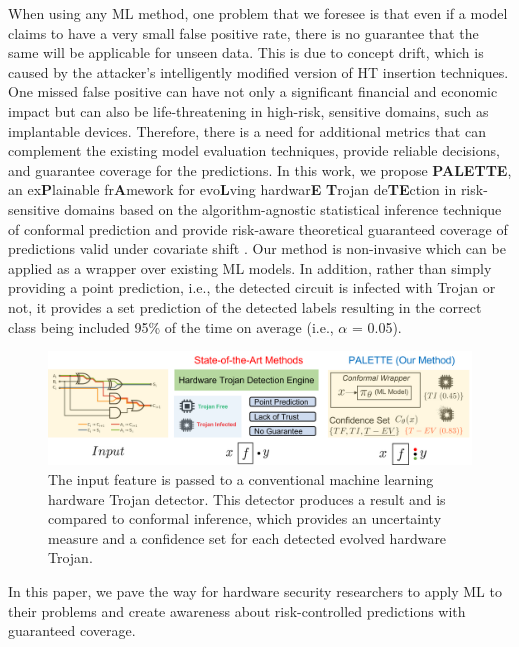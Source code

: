 When using any ML method, one problem that we foresee is that even if a model claims to have a very small false positive rate, there is no guarantee that the same will be applicable for unseen data. This is due to concept drift, which is caused by the attacker's intelligently modified version of HT insertion techniques. One missed false positive can have not only a significant financial and economic impact but can also be life-threatening in high-risk, sensitive domains, such as implantable devices. Therefore, there is a need for additional metrics that can complement the existing model evaluation techniques, provide reliable decisions, and guarantee coverage for the predictions. In this work, we propose \textbf{PALETTE}, an ex\textbf{P}lainable fr\textbf{A}mework for evo\textbf{L}ving hardwar\textbf{E} \textbf{T}rojan de\textbf{TE}ction in risk-sensitive domains based on the algorithm-agnostic statistical inference technique of conformal prediction \cite{shafer2008tutorial} and provide risk-aware theoretical guaranteed coverage of predictions valid under covariate shift \cite{tibshirani2019conformal}. Our method is non-invasive which can be applied as a wrapper over existing ML models. In addition, rather than simply providing a point prediction, i.e., the detected circuit is infected with Trojan or not, it provides a set prediction of the detected labels resulting in the correct class being included 95\% of the time on average (i.e., $\alpha$ = 0.05).

\begin{figure}[ht]
  \centering
   \includegraphics[width=0.95\linewidth]{figs/Intro3.png}
   \caption{The input feature is passed to a conventional machine learning hardware Trojan detector. This detector produces a result and is compared to conformal inference, which provides an uncertainty measure and a confidence set for each detected evolved hardware Trojan.}
  \label{fig:intro}
\end{figure}


In this paper, we pave the way for hardware security researchers to apply ML to their problems and create awareness about risk-controlled predictions with guaranteed coverage.

